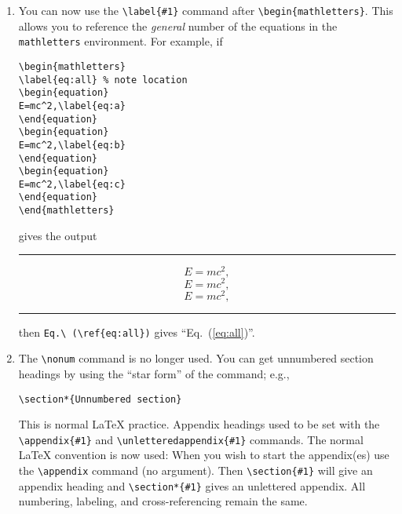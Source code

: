 \begin{enumerate}
\item You can now use the
\verb+\label{#1}+ command
after \verb+\begin{mathletters}+. This allows you to
reference the {\em general\/} number of the equations in the
\verb+mathletters+ environment. For example, if
\begin{verbatim}
\begin{mathletters}
\label{eq:all} % note location
\begin{equation}
E=mc^2,\label{eq:a}
\end{equation}
\begin{equation}
E=mc^2,\label{eq:b}
\end{equation}
\begin{equation}
E=mc^2,\label{eq:c}
\end{equation}
\end{mathletters}
\end{verbatim}
gives the output
\smallskip\hrule\smallskip
\begin{mathletters}
\label{eq:all}
\begin{equation}
E=mc^2,\label{eq:a}
\end{equation}
\begin{equation}
E=mc^2,\label{eq:b}
\end{equation}
\begin{equation}
E=mc^2,\label{eq:c}
\end{equation}
\end{mathletters}
\smallskip\hrule\smallskip
then \verb+Eq.\ (\ref{eq:all})+ gives ``Eq.\ (\ref{eq:all})''.

\item The \verb+\nonum+ command is no longer used. You can get unnumbered
section headings by using the ``star form'' of the command; e.g.,
\begin{verbatim}
\section*{Unnumbered section}
\end{verbatim}
This is normal \LaTeX{} practice. Appendix headings used to be set with the
\verb+\appendix{#1}+ and \verb+\unletteredappendix{#1}+ commands. The
normal \LaTeX{} convention is now used: When you wish to start the
appendix(es) use the \verb+\appendix+ command (no argument). Then
\verb+\section{#1}+ will give an appendix heading and \verb+\section*{#1}+
gives an unlettered appendix. All numbering, labeling, and
cross-referencing remain the same.


\end{enumerate}
